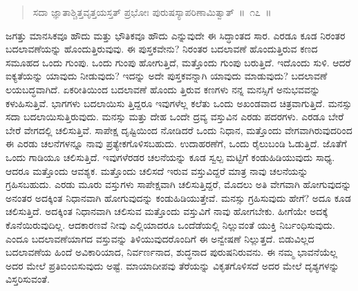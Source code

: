\vspace{-0.5cm}


\vspace{0.2cm}

\vspace{-0.3cm}

\begin{verse}
ಸದಾ ಜ್ಞಾತಾಶ್ಚಿತ್ತವೃತ್ತಯಸ್ತತ್​ ಪ್ರಭೋಃ ಪುರುಷಸ್ಯಾಪರಿಣಾಮಿತ್ವಾತ್​~॥~೧೭~॥
\end{verse}

\vspace{-0.5cm}


\vspace{0.2cm}

ಜಗತ್ತು ಮಾನಸಿಕವೂ ಹೌದು ಮತ್ತು ಭೌತಿಕವೂ ಹೌದು ಎನ್ನುವುದೇ ಈ ಸಿದ್ಧಾಂತದ ಸಾರ. ಎರಡೂ ಕೂಡ ನಿರಂತರ ಬದಲಾವಣೆಯನ್ನು ಹೊಂದುತ್ತಿರುವುವು. ಈ ಪುಸ್ತಕವೇನು? ನಿರಂತರ ಬದಲಾವಣೆ ಹೊಂದುತ್ತಿರುವ ಕಣದ ಸಮೂಹದ ಒಂದು ಗುಂಪು. ಒಂದು ಗುಂಪು ಹೋಗುತ್ತಿದೆ, ಮತ್ತೊಂದು ಗುಂಪು ಬರುತ್ತಿದೆ. ಇದೊಂದು ಸುಳಿ. ಆದರೆ ಐಕ್ಯತೆಯನ್ನು ಯಾವುದು ನೀಡುವುದು? ಇದನ್ನು ಅದೇ ಪುಸ್ತಕವನ್ನಾಗಿ ಯಾವುದು ಮಾಡುವುದು? ಬದಲಾವಣೆ ಲಯಬದ್ಧವಾಗಿದೆ. ಏಕರೀತಿಯಿಂದ ಬದಲಾವಣೆ ಹೊಂದು ತ್ತಿರುವ ಕಣಗಳು ನನ್ನ ಮನಸ್ಸಿಗೆ ಅನುಭವವನ್ನು ಕಳುಹಿಸುತ್ತಿವೆ. ಭಾಗಗಳು ಬದಲಾಯಿಸು ತ್ತಿದ್ದರೂ ಇವುಗಳೆಲ್ಲ ಕಲೆತು ಒಂದು ಅಖಂಡವಾದ ಚಿತ್ರವಾಗುತ್ತಿದೆ. ಮನಸ್ಸು ಸದಾ ಬದಲಾಯಿಸುತ್ತಿರುವುದು. ಮನಸ್ಸು ಮತ್ತು ದೇಹ ಒಂದೇ ದ್ರವ್ಯ ವಸ್ತುವಿನ ಎರಡು ಪದರಗಳು. ಎರಡೂ ಬೇರೆ ಬೇರೆ ವೇಗದಲ್ಲಿ ಚಲಿಸುತ್ತಿವೆ. ಸಾಪೇಕ್ಷ ದೃಷ್ಟಿಯಿಂದ ನೋಡಿದರೆ ಒಂದು ನಿಧಾನ, ಮತ್ತೊಂದು ವೇಗವಾಗಿರುವುದರಿಂದ ಈ ಎರಡು ಚಲನೆಗಳನ್ನೂ ನಾವು ಪ್ರತ್ಯೇಕಗೊಳಿಸಬಹುದು. ಉದಾಹರಣೆಗೆ, ಒಂದು ರೈಲುಬಂಡಿ ಓಡುತ್ತಿದೆ. ಜೊತೆಗೆ ಒಂದು ಗಾಡಿಯೂ ಚಲಿಸುತ್ತಿದೆ. ಇವುಗಳೆರಡರ ಚಲನೆಯನ್ನು ಕೂಡ ಸ್ವಲ್ಪ ಮಟ್ಟಿಗೆ ಕಂಡುಹಿಡಿಯುವುದು ಸಾಧ್ಯ. ಆದರೂ ಮತ್ತೊಂದು ಆವಶ್ಯಕ. ಮತ್ತೊಂದು ಚಲಿಸದೆ ಇರುವ ವಸ್ತುವಿದ್ದರೆ ಮಾತ್ರ ನಾವು ಚಲನೆಯನ್ನು ಗ್ರಹಿಸಬಹುದು. ಎರಡು ಮೂರು ವಸ್ತುಗಳು ಸಾಪೇಕ್ಷವಾಗಿ ಚಲಿಸುತ್ತಿದ್ದರೆ, ಮೊದಲು ಅತಿ ವೇಗವಾಗಿ ಹೋಗುವುದನ್ನು ಅನಂತರ ಅದಕ್ಕಿಂತ ನಿಧಾನವಾಗಿ ಹೋಗುವುದನ್ನು ಕಂಡುಹಿಡಿಯುತ್ತೇವೆ. ಮನಸ್ಸು ಗ್ರಹಿಸುವುದು ಹೇಗೆ? ಅದೂ ಕೂಡ ಚಲಿಸುತ್ತಿದೆ. ಅದಕ್ಕಿಂತ ನಿಧಾನವಾಗಿ ಚಲಿಸುವ ಮತ್ತೊಂದು ವಸ್ತುವಿಗೆ ನಾವು ಹೋಗಬೇಕು. ಹೀಗೆಯೇ ಅದಕ್ಕೆ ಕೊನೆಯಿರುವುದಿಲ್ಲ. ಆದಕಾರಣವೆ ನೀವು ಎಲ್ಲಿಯಾದರೂ ಒಂದೆಡೆಯಲ್ಲಿ ನಿಲ್ಲುವಂತೆ ಯುಕ್ತಿ ನಿರ್ಬಂಧಿಸುವುದು. ಎಂದೂ ಬದಲಾವಣೆಯಾಗದ ವಸ್ತುವನ್ನು ತಿಳಿಯುವುದರೊಂದಿಗೆ ಈ ಅನ್ವೇಷಣೆ ನಿಲ್ಲುತ್ತದೆ. ಬಿಡುವಿಲ್ಲದ ಬದಲಾವಣೆಯ ಹಿಂದೆ ಅವಿಕಾರಿಯಾದ, ನಿರ್ವರ್ಣನಾದ, ಶುದ್ಧನಾದ ಪುರುಷನಿರುವನು. ಈ ನಮ್ಮ ಭಾವನೆಯೆಲ್ಲ ಅದರ ಮೇಲೆ ಪ್ರತಿಬಿಂಬಿಸುವುದು ಅಷ್ಟೆ. ಮಾಯಾದೀಪವು ತೆರೆಯನ್ನು ವಿಕೃತಗೊಳಿಸದೆ ಅದರ ಮೇಲೆ ದೃಶ್ಯಗಳನ್ನು ವಿಸ್ತರಿಸುವಂತೆ. 

\vspace{-0.3cm}

